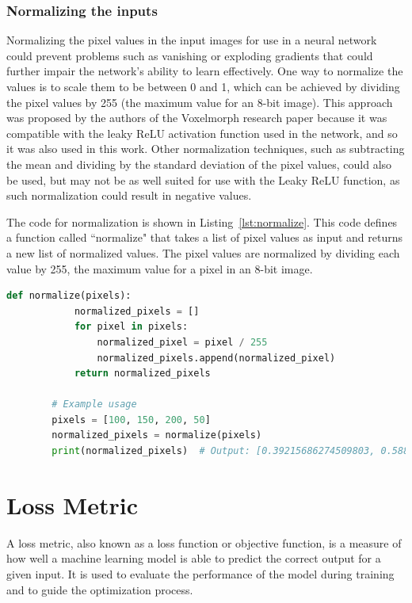 \documentclass{book}
\begin{document}
	\subsubsection{Normalizing the inputs}
	Normalizing the pixel values in the input images for use in a neural network could prevent problems such as vanishing or exploding gradients that could further impair the network's ability to learn effectively. One way to normalize the values is to scale them to be between 0 and 1, which can be achieved by dividing the pixel values by 255 (the maximum value for an 8-bit image). This approach was proposed by the authors of the Voxelmorph research paper because it was compatible with the leaky ReLU activation function used in the network, and so it was also used in this work. Other normalization techniques, such as subtracting the mean and dividing by the standard deviation of the pixel values, could also be used, but may not be as well suited for use with the Leaky ReLU function, as such normalization could result in negative values.
	
	The code for normalization is shown in Listing~\ref{lst:normalize}. This code defines a function called ``normalize" that takes a list of pixel values as input and returns a new list of normalized values. The pixel values are normalized by dividing each value by 255, the maximum value for a pixel in an 8-bit image.
	\newpage
	
	\begin{lstlisting}[language=python, label=lst:normalize, caption=Pseudo function to show the normalization of pixel intensity values.]
		def normalize(pixels):
			normalized_pixels = []
			for pixel in pixels:
				normalized_pixel = pixel / 255
				normalized_pixels.append(normalized_pixel)
			return normalized_pixels
	
		# Example usage
		pixels = [100, 150, 200, 50]
		normalized_pixels = normalize(pixels)
		print(normalized_pixels)  # Output: [0.39215686274509803, 0.5882352941176471, 0.7843137254901961, 0.19607843137254902]
	\end{lstlisting}
	
	
	
	\section{Loss Metric}\label{sec:loss_metric}
	A loss metric, also known as a loss function or objective function, is a measure of how well a machine learning model is able to predict the correct output for a given input. It is used to evaluate the performance of the model during training and to guide the optimization process.
	
\end{document}
